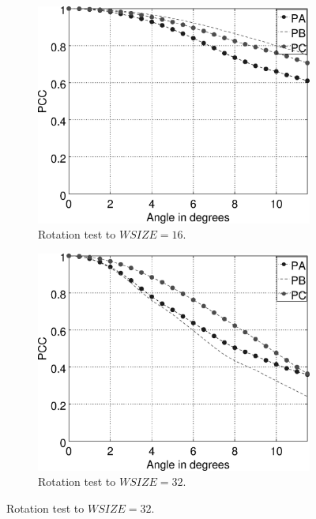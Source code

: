 \begin{figure}[H]
  \centering
  \begin{subfigure}[b]{0.45\textwidth}
    \includegraphics[width=\textwidth]{image_rot_plot-16.eps}
    \vspace{2pt}
    \caption{Rotation test to $WSIZE=16$.}
    \label{fig:choosingr16}
  \end{subfigure}
  \begin{subfigure}[b]{0.45\textwidth}
    \includegraphics[width=\textwidth]{image_rot_plot-32.eps}
    \vspace{2pt}
    \caption{Rotation test to $WSIZE=32$.}

\end{subfigure}
\end{figure}
